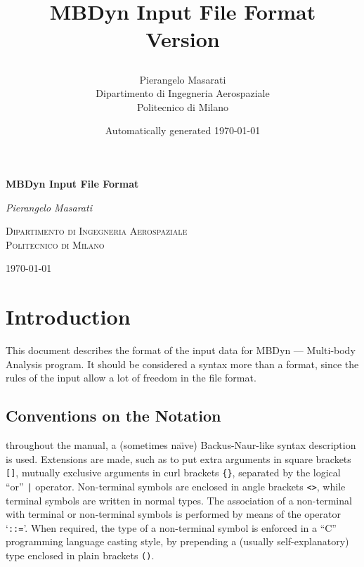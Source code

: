 \documentclass[10pt,dvips]{report}
\newcommand{\kw}[1]{\texttt{#1}}
\begin{document}
\begin{latexonly}
\title{\bf MBDyn Input File Format \\
Version

}
\author{Pierangelo Masarati \vspace{5mm}\\
    \sc Dipartimento di Ingegneria Aerospaziale \\
    \sc Politecnico di Milano}
\date{Automatically generated \today}
\maketitle
\end{latexonly}

\begin{htmlonly}
\begin{center}
\textbf{\LARGE MBDyn Input File Format}

\emph{\large Pierangelo Masarati}

\textsc{Dipartimento di Ingegneria Aerospaziale \\ Politecnico di Milano}

\today
\end{center}
\end{htmlonly}




\tableofcontents
\newpage

\chapter{Introduction}
This document describes the format of the input data for MBDyn ---
Multi-body Analysis program.
It should be considered a syntax more than a format, since the rules of the
input allow a lot of freedom in the file format. 

\section{Conventions on the Notation}
throughout the manual, a (sometimes na\"{\i}ve) 
Backus-Naur-like syntax description is used. 
Extensions are made, such as to put extra arguments in square brackets
\kw{[]}, mutually exclusive arguments in curl brackets \kw{\{\}},
separated by the logical ``or'' \kw{|} operator.
Non-terminal symbols are enclosed in angle brackets \kw{<>}, while
terminal symbols are written in normal types.
The association of a non-terminal with terminal or non-terminal
symbols is performed by means of the operator `\kw{::=}'. 
When required, the type of a non-terminal symbol is enforced in a ``C''
programming language casting style, by prepending a (usually
self-explanatory) type enclosed in plain brackets \kw{()}.
\end{document}
